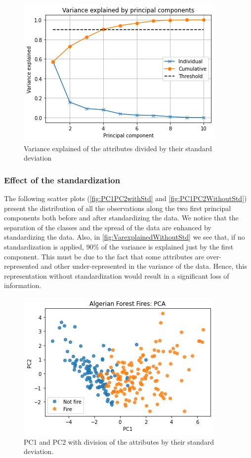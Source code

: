 \documentclass[10pt]{article}
\numberwithin{equation}{section}
\numberwithin{figure}{section}
\numberwithin{table}{section}
\begin{document}
\begin{figure} [H]
    \centering
    \includegraphics[scale=0.5]{Figures/VarianceExplained.png}
    \caption{Variance explained of the attributes divided by their standard deviation}
    \label{fig:Varexplained}
\end{figure}

\subsubsection{Effect of the standardization}

The following scatter plots (\autoref{fig:PC1PC2withStd} and \autoref{fig:PC1PC2WithoutStd}) present the distribution of all the observations along the two first principal components both before and after standardizing the data. We notice that the separation of the classes and the spread of the data are enhanced by standardizing the data. Also, in \autoref{fig:VarexplainedWithoutStd} we see that, if no standardization is applied, 90\% of the variance is explained just by the first component. This must be due to the fact that some attributes are over-represented and other under-represented in the variance of the data. Hence, this representation without standardization would result in a significant loss of information.

\begin{figure} [H]
    \centering
    \includegraphics[scale=0.5]{Figures/PC1VsPC2_withStandardizing.png}
    \caption{PC1 and PC2 with division of the attributes by their standard deviation.}
    \label{fig:PC1PC2withStd}
\end{figure}
\end{document}
